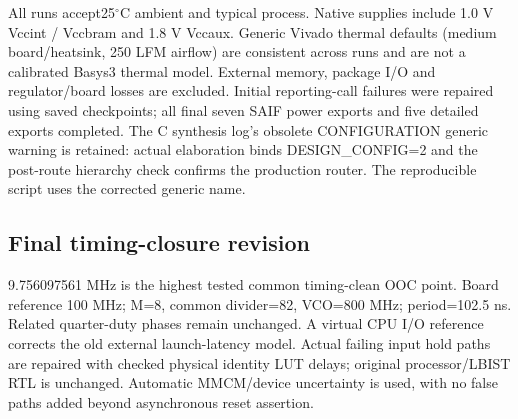 \documentclass[11pt,a4paper]{article}
\begin{document}
All runs accept25$^\circ$C ambient and typical process. Native supplies include 1.0 V Vccint / Vccbram and 1.8 V Vccaux. Generic Vivado thermal defaults (medium board/heatsink, 250 LFM airflow) are consistent across runs and are not a calibrated Basys3 thermal model. External memory, package I/O and regulator/board losses are excluded. Initial reporting-call failures were repaired using saved checkpoints; all final seven SAIF power exports and five detailed exports completed. The C synthesis log's obsolete CONFIGURATION generic warning is retained: actual elaboration binds DESIGN\_CONFIG=2 and the post-route hierarchy check confirms the production router. The reproducible script uses the corrected generic name.



\subsection{Final timing-closure revision}


9.756097561 MHz is the highest tested common timing-clean OOC point. Board reference 100 MHz; M=8, common divider=82, VCO=800 MHz; period=102.5 ns. Related quarter-duty phases remain unchanged. A virtual CPU I/O reference corrects the old external launch-latency model. Actual failing input hold paths are repaired with checked physical identity LUT delays; original processor/LBIST RTL is unchanged. Automatic MMCM/device uncertainty is used, with no false paths added beyond asynchronous reset assertion.



\begin{center}\end{center}


\begin{center}\end{center}
\end{document}
